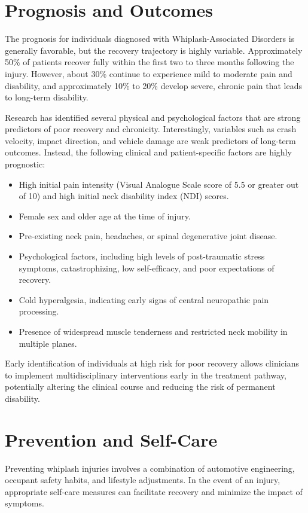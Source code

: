 \section*{Prognosis and Outcomes}
The prognosis for individuals diagnosed with Whiplash-Associated Disorders is generally favorable, but the recovery trajectory is highly variable. Approximately 50\% of patients recover fully within the first two to three months following the injury. However, about 30\% continue to experience mild to moderate pain and disability, and approximately 10\% to 20\% develop severe, chronic pain that leads to long-term disability.

Research has identified several physical and psychological factors that are strong predictors of poor recovery and chronicity. Interestingly, variables such as crash velocity, impact direction, and vehicle damage are weak predictors of long-term outcomes. Instead, the following clinical and patient-specific factors are highly prognostic:
\begin{itemize}
    \item High initial pain intensity (Visual Analogue Scale score of 5.5 or greater out of 10) and high initial neck disability index (NDI) scores.
    \item Female sex and older age at the time of injury.
    \item Pre-existing neck pain, headaches, or spinal degenerative joint disease.
    \item Psychological factors, including high levels of post-traumatic stress symptoms, catastrophizing, low self-efficacy, and poor expectations of recovery.
    \item Cold hyperalgesia, indicating early signs of central neuropathic pain processing.
    \item Presence of widespread muscle tenderness and restricted neck mobility in multiple planes.
\end{itemize}
Early identification of individuals at high risk for poor recovery allows clinicians to implement multidisciplinary interventions early in the treatment pathway, potentially altering the clinical course and reducing the risk of permanent disability.

\section*{Prevention and Self-Care}
Preventing whiplash injuries involves a combination of automotive engineering, occupant safety habits, and lifestyle adjustments. In the event of an injury, appropriate self-care measures can facilitate recovery and minimize the impact of symptoms.

